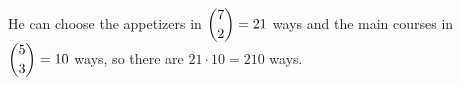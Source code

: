 He can choose the appetizers in $\dbinom72=21$ ways and the main courses in $\dbinom53=10$ ways, so there are $21\cdot10=\boxed{210}$ ways.
